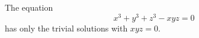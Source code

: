 \begin{proposition}
    The equation
\[
    x^3+y^3+z^3-xyz=0
\]
    has only the trivial solutions with $xyz=0$.
\end{proposition}
